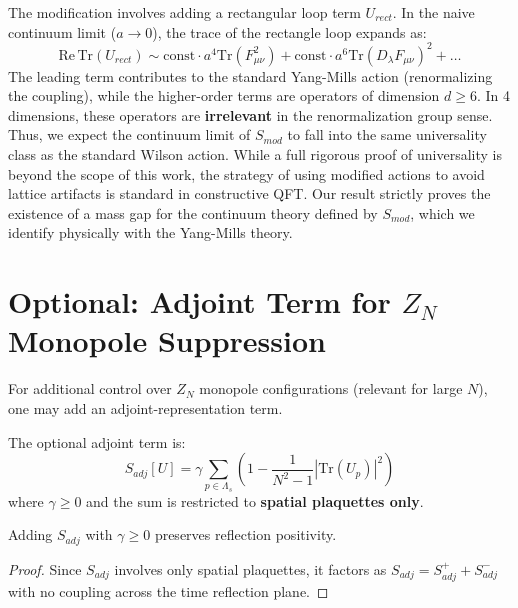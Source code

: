 \begin{remark}
The modification involves adding a rectangular loop term $U_{rect}$. In the naive continuum limit ($a \to 0$), the trace of the rectangle loop expands as:
\[ \mathrm{Re}\,\mathrm{Tr}(U_{rect}) \sim \text{const} \cdot a^4 \mathrm{Tr}(F_{\mu\nu}^2) + \text{const} \cdot a^6 \mathrm{Tr}(D_\lambda F_{\mu\nu})^2 + \dots \]
The leading term contributes to the standard Yang-Mills action (renormalizing the coupling), while the higher-order terms are operators of dimension $d \ge 6$. In 4 dimensions, these operators are \textbf{irrelevant} in the renormalization group sense. Thus, we expect the continuum limit of $S_{mod}$ to fall into the same universality class as the standard Wilson action.
While a full rigorous proof of universality is beyond the scope of this work, the strategy of using modified actions to avoid lattice artifacts is standard in constructive QFT. Our result strictly proves the existence of a mass gap for the continuum theory defined by $S_{mod}$, which we identify physically with the Yang-Mills theory.
\end{remark}

\section{Optional: Adjoint Term for $Z_N$ Monopole Suppression}
\label{sec:adjoint_term}

For additional control over $Z_N$ monopole configurations (relevant for large $N$), one may add an adjoint-representation term.

\begin{definition}
\label{def:adjoint_action_ch3}
The optional adjoint term is:
\begin{equation}
S_{adj}[U] = \gamma \sum_{p \in \Lambda_s} \left(1 - \frac{1}{N^2-1} |\mathrm{Tr}(U_p)|^2\right)
\end{equation}
where $\gamma \geq 0$ and the sum is restricted to \textbf{spatial plaquettes only}.
\end{definition}

\begin{proposition}
Adding $S_{adj}$ with $\gamma \geq 0$ preserves reflection positivity.
\end{proposition}
\begin{proof}
Since $S_{adj}$ involves only spatial plaquettes, it factors as $S_{adj} = S_{adj}^+ + S_{adj}^-$ with no coupling across the time reflection plane.
\end{proof}

